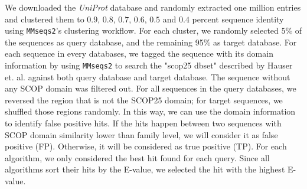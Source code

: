We downloaded the \textit{UniProt} database and randomly extracted one million entries and clustered them to $0.9$, $0.8$, $0.7$, $0.6$, $0.5$ and $0.4$ percent sequence identity using \texttt{MMseqs2}'s clustering workflow.
For each cluster, we randomly selected 5\% of the sequences as query database, and the remaining 95\% as target database.
For each sequence in every databases, we tagged the sequence with its domain information by using \texttt{MMseqs2} to search the "scop25 dbset" described by Hauser et. al. \cite{hauserbioinformaticsbtw006} against both query database and target database.
The sequence without any SCOP domain was filtered out. For all sequences in the query databases, we reversed the region that is not the SCOP25 domain; for target sequences, we shuffled those regions randomly. In this way, we can use the domain information to identify false positive hits. If the hits happen between two sequences with SCOP domain similarity lower than family level, we will consider it as false positive (FP). Otherwise, it will be considered as true positive (TP). For each algorithm, we only considered the best hit found for each query. Since all algorithms
sort their hits by the E-value, we selected the hit with the highest E-value.
